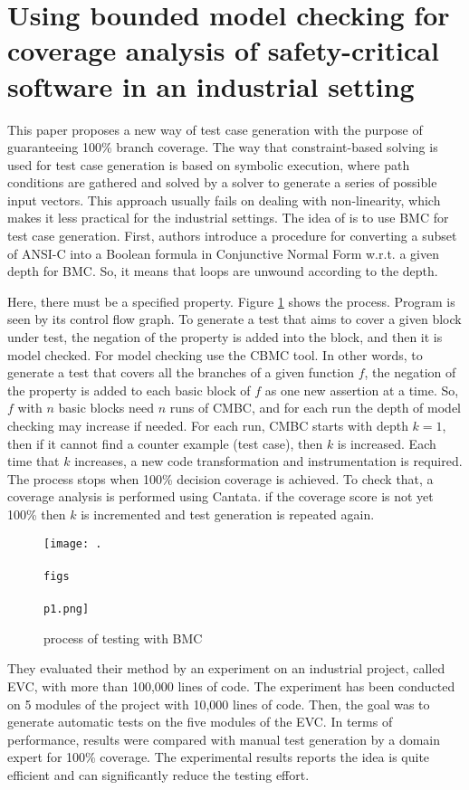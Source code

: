 \section{Using bounded model checking for coverage analysis of safety-critical software in an industrial setting \cite{angeletti2010}}

This paper proposes a new way of test case generation with the purpose of guaranteeing 100\% branch coverage. The way that constraint-based solving is used for test case generation
is based on symbolic execution, where path conditions are gathered and solved by a solver
to generate a series of possible input vectors. This approach usually fails on dealing with non-linearity, which
makes it less practical for the industrial settings.
The idea of \cite{angeletti2010} is to use BMC for test case generation.
First, authors introduce a procedure for converting a subset of ANSI-C into a Boolean
formula in Conjunctive Normal Form w.r.t. a given depth for BMC. So, it means that loops are unwound according to the depth.

Here, there must be a specified property. Figure \ref{fig:testing-bmc} shows the process.
Program is seen by its control flow graph. To generate a test
that aims to cover a given block under test, the negation of the property
is added into the block, and then it is model checked. For model checking use the CBMC tool.
In other words, to generate a test that covers all the branches of a given function $f$,
the negation of the property is added to each basic block of $f$ as one new assertion at a time.
So, $f$ with $n$ basic blocks need $n$ runs of CMBC, and for each run the
depth of model checking may increase if needed. For each run, CMBC starts with depth $k = 1$,
then if it cannot find a counter example (test case), then $k$ is increased. Each time
that $k$ increases, a new code transformation and instrumentation is required.
The process stops when 100\% decision coverage is achieved.
To check that, a coverage analysis is performed using Cantata. if the
coverage score is not yet 100\% then $k$ is incremented
and test generation is repeated again.

\begin{figure}
  \centering
  \texttt{[image: .\\\\figs\\\\p1.png]}
  \caption{process of testing with BMC}\label{fig:testing-bmc}
\end{figure}

They evaluated their method by an experiment on an industrial project, called EVC, with more than 100,000 lines of code. The experiment has been conducted on 5 modules of the project with 10,000 lines of code.  Then, the goal was to generate automatic
tests on the five modules of the EVC.
In terms of performance, results were compared
with manual test generation by a domain expert for 100\% coverage. The experimental results reports the idea is quite efficient and
can significantly reduce the testing effort.

